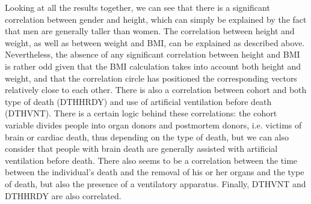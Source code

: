 \documentclass[a4paper, 11pt]{article}
\begin{document}
\begin{multicols}{2}
Looking at all the results together, we can see that there is a significant correlation between gender and height, which can simply be explained by the fact that men are generally taller than women. 
The correlation between height and weight, as well as between weight and BMI, can be explained as described above. 
Nevertheless, the absence of any significant correlation between height and BMI is rather odd given that the BMI calculation takes into account both height and weight, and that the correlation circle has positioned the corresponding vectors relatively close to each other. 
There is also a correlation between cohort and both type of death (DTHHRDY) and use of artificial ventilation before death (DTHVNT). 
There is a certain logic behind these correlations: the cohort variable divides people into organ donors and postmortem donors, i.e. victims of brain or cardiac death, thus depending on the type of death, but we can also consider that people with brain death are generally assisted with artificial ventilation before death. 
There also seems to be a correlation between the time between the individual's death and the removal of his or her organs and the type of death, but also the presence of a ventilatory apparatus. 
Finally, DTHVNT and DTHHRDY are also correlated.


\end{multicols}
\end{document}
